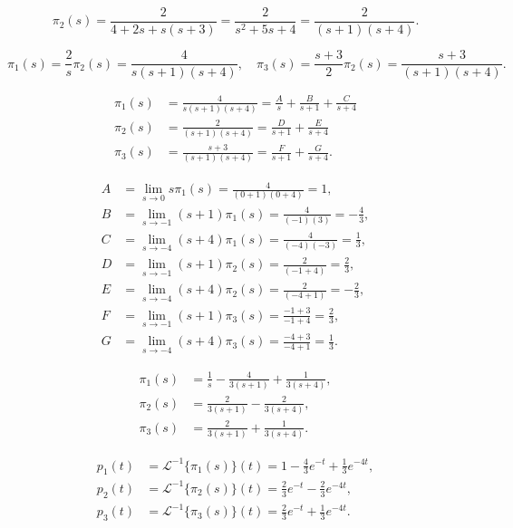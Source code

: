 \[
	\pi_2(s) = \frac{2}{4+2s+s(s+3)}
	= \frac{2}{s^2+5s+4}
	=\frac{2}{(s+1)(s+4)}.
\]

\[
	\pi_1(s) = \frac{2}{s} \pi_2(s) = \frac{4}{s(s+1)(s+4)},
	\quad
	\pi_3(s) = \frac{s+3}{2} \pi_2(s) = \frac{s+3}{(s+1)(s+4)}.
\]

\[
	\begin{aligned}
		\pi_1(s) & = \frac{4}{s(s+1)(s+4)}
		= \frac{A}{s} + \frac{B}{s+1} + \frac{C}{s+4}                         \\
		\pi_2(s) & = \frac{2}{(s+1)(s+4)} = \frac{D}{s+1} + \frac{E}{s+4}     \\
		\pi_3(s) & =	 \frac{s+3}{(s+1)(s+4)} = \frac{F}{s+1} + \frac{G}{s+4}.
	\end{aligned}
\]

\[
	\begin{aligned}
		A & = \lim_{s\rightarrow 0} s\pi_1(s)      = \frac{4}{(0+1)(0+4)} = 1,         \\
		B & = \lim_{s\rightarrow -1} (s+1)\pi_1(s) = \frac{4}{(-1)(3)} = -\frac{4}{3}, \\
		C & = \lim_{s\rightarrow -4} (s+4)\pi_1(s) = \frac{4}{(-4)(-3)} = \frac{1}{3}, \\
		D & = \lim_{s\rightarrow -1} (s+1)\pi_2(s) = \frac{2}{(-1+4)} = \frac{2}{3},   \\
		E & = \lim_{s\rightarrow -4} (s+4)\pi_2(s) = \frac{2}{(-4+1)} = -\frac{2}{3},  \\
		F & = \lim_{s\rightarrow -1} (s+1)\pi_3(s) = \frac{-1+3}{-1+4} = \frac{2}{3},  \\
		G & = \lim_{s\rightarrow -4} (s+4)\pi_3(s) = \frac{-4+3}{-4+1} = \frac{1}{3}.
	\end{aligned}
\]

\[
	\begin{aligned}
		\pi_1(s) & = \frac{1}{s} - \frac{4}{3(s+1)} + \frac{1}{3(s+4)}, \\
		\pi_2(s) & = \frac{2}{3(s+1)} - \frac{2}{3(s+4)},               \\
		\pi_3(s) & = \frac{2}{3(s+1)} + \frac{1}{3(s+4)}.
	\end{aligned}
\]

\[
	\begin{aligned}
		p_1(t) & = \mathcal{L}^{-1}\{\pi_1(s)\}(t) = 1 - \tfrac{4}{3}e^{-t} + \tfrac{1}{3}e^{-4t}, \\
		p_2(t) & = \mathcal{L}^{-1}\{\pi_2(s)\}(t) = \tfrac{2}{3}e^{-t} - \tfrac{2}{3}e^{-4t},     \\
		p_3(t) & = \mathcal{L}^{-1}\{\pi_3(s)\}(t) = \tfrac{2}{3}e^{-t} + \tfrac{1}{3}e^{-4t}.
	\end{aligned}
\]

